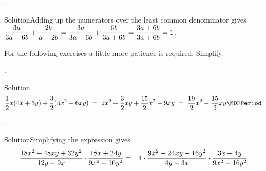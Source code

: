 \begin{MExercises}
\begin{MExercise}
\begin{MExerciseItems}
\item{. \begin{MHint}{Solution}Adding up the numerators over the least common denominator gives
$\dfrac{3a}{3a+6b}+\dfrac{2b}{a+2b}=\dfrac{3a}{3a+6b}+\dfrac{6b}{3a+6b}=\dfrac{3a+6b}{3a+6b}=1$.\end{MHint}}
\end{MExerciseItems}
\end{MExercise}

\begin{MExercise}
For the following exercises a little more patience is required. Simplify: \\
\begin{MExerciseItems}
\item{. \begin{MHint}{Solution} $$\Mdfrac12x(4x+3y)+\Mdfrac32(5x^2-6x y)\;=\; 2x^2+\Mdfrac32x y+\Mdfrac{15}2x^2-9x y \;=\; \Mdfrac{19}{2}x^2-\Mdfrac{15}{2}x y  \MDFPeriod  $$\end{MHint}}
\item{. \begin{MHint}{Solution}Simplifying the expression gives
\begin{eqnarray*}
\Mdfrac{18x^2-48x y+32y^2}{12y-9x}\cdot \Mdfrac{18x+24y}{9x^2-16y^2} & =&
4\cdot \Mdfrac{9x^2-24x y+16y^2}{4y-3x}\cdot \Mdfrac{3x+4y}{9x^2-16y^2}\\

\end{eqnarray*}
\end{MHint}}
\end{MExerciseItems}
\end{MExercise}
\end{MExercises}
